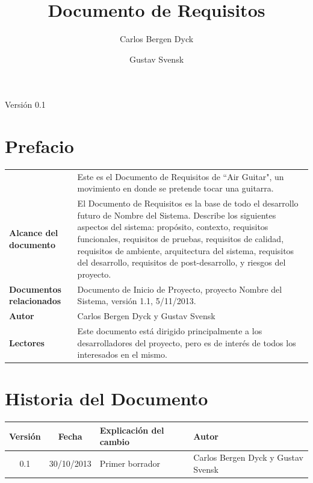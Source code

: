 \documentclass[a4paper,12pt]{article}
\title{Documento de Requisitos}
\author{Carlos Bergen Dyck \and Gustav Svensk}
\begin{document}
\renewcommand{\arraystretch}{1.5}
\maketitle
\begin{center}
        {\large Versión 0.1}
\end{center}
\newpage


\section{Prefacio}
\begin{tabular}{p{3cm} p{12cm}}
        & Este es el Documento de Requisitos de “Air Guitar", un movimiento en donde se pretende tocar una guitarra. \\
        \textbf{Alcance del documento} & El Documento de Requisitos es la base
        de todo el desarrollo futuro de Nombre del Sistema. Describe los
        siguientes aspectos del sistema: propósito, contexto, requisitos
        funcionales, requisitos de pruebas, requisitos de calidad, requisitos
        de ambiente, arquitectura del sistema, requisitos del desarrollo,
        requisitos de post-desarrollo, y riesgos del proyecto. \\
        \textbf{Documentos relacionados} & Documento de Inicio de Proyecto,
        proyecto Nombre del Sistema, versión 1.1, 5/11/2013. \\
        \textbf{Autor} & Carlos Bergen Dyck y Gustav Svensk \\
        \textbf{Lectores} & Este documento está dirigido principalmente a los
        desarrolladores del proyecto, pero es de interés de todos los
        interesados en el mismo. \\
\end{tabular}

\section{Historia del Documento}
\begin{tabular}{|c|c|p{6cm}|p{4cm}|}
        \hline
        \textbf{Versión} & \textbf{Fecha} & \textbf{Explicación del cambio} &
        \textbf{Autor} \\ \hline
        0.1 & 30/10/2013 & Primer borrador & Carlos Bergen Dyck y Gustav Svensk \\
        \hline
\end{tabular}

\newpage
\tableofcontents
\end{document}
